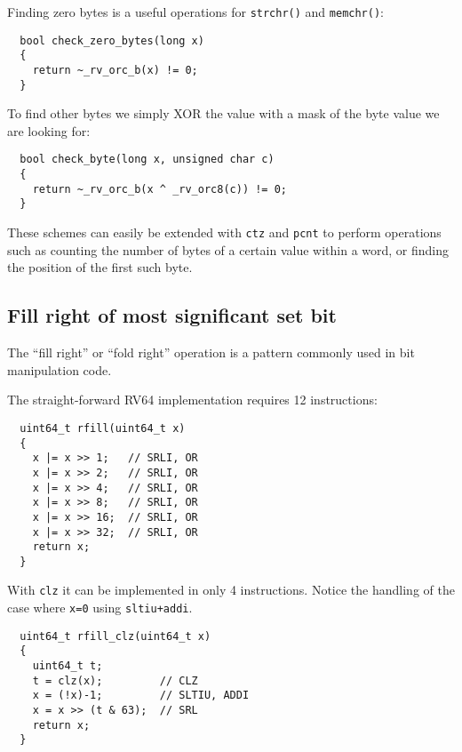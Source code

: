 Finding zero bytes is a useful operations for {\tt strchr()}
and {\tt memchr()}:

\begin{minipage}{\linewidth}
\begin{verbatim}
  bool check_zero_bytes(long x)
  {
    return ~_rv_orc_b(x) != 0;
  }
\end{verbatim}
\end{minipage}

To find other bytes we simply XOR the value with a mask of the byte value we
are looking for:

\begin{minipage}{\linewidth}
\begin{verbatim}
  bool check_byte(long x, unsigned char c)
  {
    return ~_rv_orc_b(x ^ _rv_orc8(c)) != 0;
  }
\end{verbatim}
\end{minipage}

These schemes can easily be extended with {\tt ctz} and {\tt pcnt} to perform
operations such as counting the number of bytes of a certain value within a
word, or finding the position of the first such byte.


\subsection{Fill right of most significant set bit}

The ``fill right'' or ``fold right'' operation is a pattern commonly used in bit manipulation code.~\cite{MAGIC}

The straight-forward RV64 implementation requires 12 instructions:

\begin{minipage}{\linewidth}
\begin{verbatim}
  uint64_t rfill(uint64_t x)
  {
    x |= x >> 1;   // SRLI, OR
    x |= x >> 2;   // SRLI, OR
    x |= x >> 4;   // SRLI, OR
    x |= x >> 8;   // SRLI, OR
    x |= x >> 16;  // SRLI, OR
    x |= x >> 32;  // SRLI, OR
    return x;
  }
\end{verbatim}
\end{minipage}

With {\tt clz} it can be implemented in only 4 instructions. Notice the
handling of the case where {\tt x=0} using {\tt sltiu+addi}.

\begin{minipage}{\linewidth}
\begin{verbatim}
  uint64_t rfill_clz(uint64_t x)
  {
    uint64_t t;
    t = clz(x);         // CLZ
    x = (!x)-1;         // SLTIU, ADDI
    x = x >> (t & 63);  // SRL
    return x;
  }
\end{verbatim}
\end{minipage}

